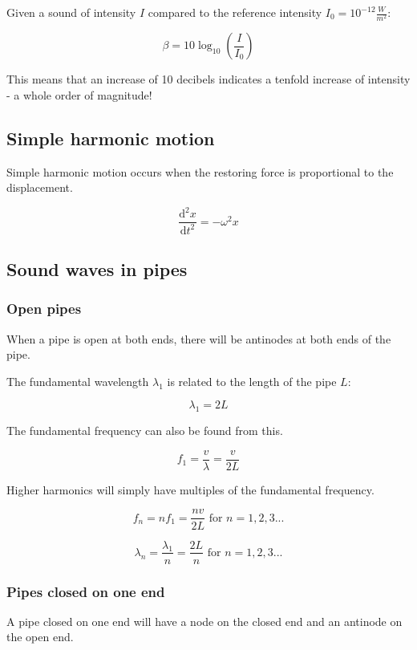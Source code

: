 \documentclass[12pt]{article}
\begin{document}
Given a sound of intensity $I$ compared to the reference intensity $I_0 = 10^{-12} \frac{W}{m^2}$:

\[
\boxed{
\beta = 10\log_{10}\left(\frac{I}{I_0}\right)
}
\]

This means that an increase of 10 decibels indicates a tenfold increase of intensity - a whole order of magnitude!

\newpage

\subsection{Simple harmonic motion}

Simple harmonic motion occurs when the restoring force is proportional to the displacement.

\[
\boxed{
\frac{\mathrm{d}^2 x}{\mathrm{d}t^2} = -\omega^2 x
}
\]

\subsection{Sound waves in pipes}

\subsubsection{Open pipes}

When a pipe is open at both ends, there will be antinodes at both ends of the pipe.

The fundamental wavelength $\lambda_1$ is related to the length of the pipe $L$:

\[
\boxed{
\lambda_1 = 2L
}
\]

The fundamental frequency can also be found from this.

\[
\boxed{
f_1 = \frac{v}{\lambda} = \frac{v}{2L}
}
\]

Higher harmonics will simply have multiples of the fundamental frequency.

\[
\boxed{
f_n = nf_1 = \frac{nv}{2L}\text{ for }n = 1,2,3...
}
\]

\[
\boxed{
\lambda_n = \frac{\lambda_1}{n} = \frac{2L}{n}\text{ for }n = 1,2,3...
}
\]

\subsubsection{Pipes closed on one end}

A pipe closed on one end will have a node on the closed end and an antinode on the open end.
\end{document}
